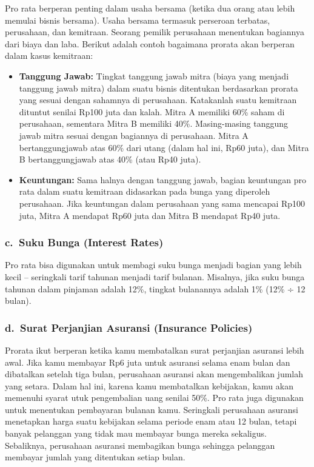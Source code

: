 \documentclass[
]{book}
\providecommand{\tightlist}{%
  \setlength{\itemsep}{0pt}\setlength{\parskip}{0pt}}
\begin{document}
Pro rata berperan penting dalam usaha bersama (ketika dua orang atau lebih memulai bisnis bersama). Usaha bersama termasuk perseroan terbatas, perusahaan, dan kemitraan. Seorang pemilik perusahaan menentukan bagiannya dari biaya dan laba. Berikut adalah contoh bagaimana prorata akan berperan dalam kasus kemitraan:

\begin{itemize}
\tightlist
\item
  \textbf{Tanggung Jawab:} Tingkat tanggung jawab mitra (biaya yang menjadi tanggung jawab mitra) dalam suatu bisnis ditentukan berdasarkan prorata yang sesuai dengan sahamnya di perusahaan. Katakanlah suatu kemitraan dituntut senilai Rp100 juta dan kalah. Mitra A memiliki 60\% saham di perusahaan, sementara Mitra B memiliki 40\%. Masing-masing tanggung jawab mitra sesuai dengan bagiannya di perusahaan. Mitra A bertanggungjawab atas 60\% dari utang (dalam hal ini, Rp60 juta), dan Mitra B bertanggungjawab atas 40\% (atau Rp40 juta).
\item
  \textbf{Keuntungan:} Sama halnya dengan tanggung jawab, bagian keuntungan pro rata dalam suatu kemitraan didasarkan pada bunga yang diperoleh perusahaan. Jika keuntungan dalam perusahaan yang sama mencapai Rp100 juta, Mitra A mendapat Rp60 juta dan Mitra B mendapat Rp40 juta.
\end{itemize}

\hypertarget{c.-suku-bunga-interest-rates}{%
\subsubsection*{c.~Suku Bunga (Interest Rates)}\label{c.-suku-bunga-interest-rates}}

Pro rata bisa digunakan untuk membagi suku bunga menjadi bagian yang lebih kecil -- seringkali tarif tahunan menjadi tarif bulanan. Misalnya, jika suku bunga tahunan dalam pinjaman adalah 12\%, tingkat bulanannya adalah 1\% (12\% ÷ 12 bulan).

\hypertarget{d.-surat-perjanjian-asuransi-insurance-policies}{%
\subsubsection*{d.~Surat Perjanjian Asuransi (Insurance Policies)}\label{d.-surat-perjanjian-asuransi-insurance-policies}}

Prorata ikut berperan ketika kamu membatalkan surat perjanjian asuransi lebih awal. Jika kamu membayar Rp6 juta untuk asuransi selama enam bulan dan dibatalkan setelah tiga bulan, perusahaan asuransi akan mengembalikan jumlah yang setara. Dalam hal ini, karena kamu membatalkan kebijakan, kamu akan memenuhi syarat utuk pengembalian uang senilai 50\%. Pro rata juga digunakan untuk menentukan pembayaran bulanan kamu. Seringkali perusahaan asuransi menetapkan harga suatu kebijakan selama periode enam atau 12 bulan, tetapi banyak pelanggan yang tidak mau membayar bunga mereka sekaligus. Sebaliknya, perusahaan asuransi membagikan bunga sehingga pelanggan membayar jumlah yang ditentukan setiap bulan.
\end{document}
